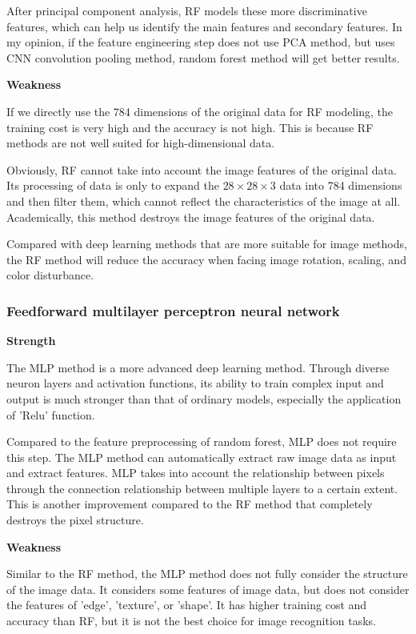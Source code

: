 After principal component analysis, RF models these more discriminative features, which can help us identify the main features and secondary features. In my opinion, if the feature engineering step does not use PCA method, but uses CNN convolution pooling method, random forest method will get better results.

\bigskip

\noindent\textbf{Weakness}

If we directly use the 784 dimensions of the original data for RF modeling, the training cost is very high and the accuracy is not high. This is because RF methods are not well suited for high-dimensional data.

Obviously, RF cannot take into account the image features of the original data. Its processing of data is only to expand the $28\times28\times3$ data into 784 dimensions and then filter them, which cannot reflect the characteristics of the image at all. Academically, this method destroys the image features of the original data.

Compared with deep learning methods that are more suitable for image methods, the RF method will reduce the accuracy when facing image rotation, scaling, and color disturbance.

\subsubsection{Feedforward multilayer perceptron neural network}

\noindent\textbf{Strength}

The MLP method is a more advanced deep learning method. Through diverse neuron layers and activation functions, its ability to train complex input and output is much stronger than that of ordinary models, especially the application of 'Relu' function.

Compared to the feature preprocessing of random forest, MLP does not require this step. The MLP method can automatically extract raw image data as input and extract features. MLP takes into account the relationship between pixels through the connection relationship between multiple layers to a certain extent. This is another improvement compared to the RF method that completely destroys the pixel structure.

\bigskip

\noindent\textbf{Weakness}

Similar to the RF method, the MLP method does not fully consider the structure of the image data. It considers some features of image data, but does not consider the features of 'edge', 'texture', or 'shape'. It has higher training cost and accuracy than RF, but it is not the best choice for image recognition tasks.

